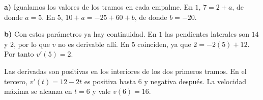 \textbf{a)} Igualamos los valores de los tramos en cada empalme.
En $1$, $7=2+a$, de donde $a=5$. En $5$,
$10+a=-25+60+b$, de donde $b=-20$.

\textbf{b)} Con estos parámetros ya hay continuidad.
En $1$ las pendientes laterales son $14$ y $2$, por lo que
$v$ no es derivable allí. En $5$ coinciden, ya que
$2=-2(5)+12$. Por tanto $v'(5)=2$.

Las derivadas son positivas en los interiores de los dos primeros
tramos. En el tercero, $v'(t)=12-2t$ es positiva hasta $6$
y negativa después. La velocidad máxima se alcanza en
$\boxed{t=6}$ y vale $v(6)=16$.
